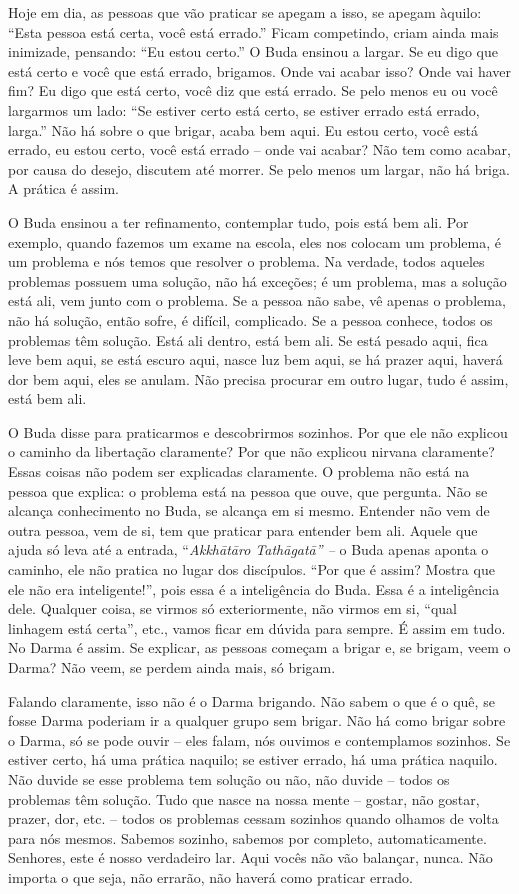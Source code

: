 Hoje em dia, as pessoas que vão praticar se apegam a isso, se apegam
àquilo: “Esta pessoa está certa, você está errado.” Ficam competindo,
criam ainda mais inimizade, pensando: “Eu estou certo.” O Buda ensinou
a largar. Se eu digo que está certo e você que está errado, brigamos.
Onde vai acabar isso? Onde vai haver fim? Eu digo que está certo, você
diz que está errado. Se pelo menos eu ou você largarmos um lado: “Se
estiver certo está certo, se estiver errado está errado, larga.” Não há
sobre o que brigar, acaba bem aqui. Eu estou certo, você está errado,
eu estou certo, você está errado – onde vai acabar? Não tem como
acabar, por causa do desejo, discutem até morrer. Se pelo menos um
largar, não há briga. A prática é assim. 

O Buda ensinou a ter refinamento, contemplar tudo, pois está bem
ali. Por exemplo, quando fazemos um exame na escola, eles nos colocam
um problema, é um problema e nós temos que resolver o problema. Na
verdade, todos aqueles problemas possuem uma solução, não há exceções;
é um problema, mas a solução está ali, vem junto com o problema. Se a
pessoa não sabe, vê apenas o problema, não há solução, então sofre, é
difícil, complicado. Se a pessoa conhece, todos os problemas têm
solução. Está ali dentro, está bem ali. Se está pesado aqui, fica leve
bem aqui, se está escuro aqui, nasce luz bem aqui, se há prazer aqui,
haverá dor bem aqui, eles se anulam. Não precisa procurar em outro
lugar, tudo é assim, está bem ali. 

O Buda disse para praticarmos e descobrirmos sozinhos. Por que ele
não explicou o caminho da libertação claramente? Por que não explicou
nirvana claramente? Essas coisas não podem ser explicadas claramente. O
problema não está na pessoa que explica: o problema está na pessoa que
ouve, que pergunta. Não se alcança conhecimento no Buda, se alcança em
si mesmo. Entender não vem de outra pessoa, vem de si, tem que praticar
para entender bem ali. Aquele que ajuda só leva até a entrada,
“\textit{Akkh\=at\=aro Tath\=agat\=a” –} o Buda apenas aponta o
caminho, ele não pratica no lugar dos discípulos. “Por que é assim?
Mostra que ele não era inteligente!”, pois essa é a inteligência do
Buda. Essa é a inteligência dele. Qualquer coisa, se virmos só
exteriormente, não virmos em si, “qual linhagem está certa”, etc.,
vamos ficar em dúvida para sempre. É assim em tudo. No Darma é assim.
Se explicar, as pessoas começam a brigar e, se brigam, veem o Darma?
Não veem, se perdem ainda mais, só brigam. 

Falando claramente, isso não é o Darma brigando. Não sabem o que é o
quê, se fosse Darma poderiam ir a qualquer grupo sem brigar. Não há
como brigar sobre o Darma, só se pode ouvir – eles falam, nós ouvimos e
contemplamos sozinhos. Se estiver certo, há uma prática naquilo; se
estiver errado, há uma prática naquilo. Não duvide se esse problema tem
solução ou não, não duvide – todos os problemas têm solução. Tudo que
nasce na nossa mente – gostar, não gostar, prazer, dor, etc. – todos os
problemas cessam sozinhos quando olhamos de volta para nós mesmos.
Sabemos sozinho, sabemos por completo, automaticamente. Senhores, este
é nosso verdadeiro lar. Aqui vocês não vão balançar, nunca. Não importa
o que seja, não errarão, não haverá como praticar errado. 

